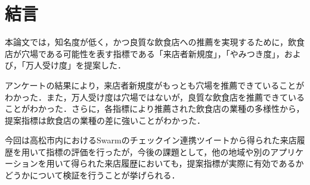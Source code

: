 \chapter{結言}
\label{chap:conclusion}

 本論文では，知名度が低く，かつ良質な飲食店への推薦を実現するために，飲食店が穴場である可能性を表す指標である「来店者新規度」，「やみつき度」，および，「万人受け度」を提案した．\par
アンケートの結果により，来店者新規度がもっとも穴場を推薦できていることがわかった．また，万人受け度は穴場ではないが，良質な飲食店を推薦できていることがわかった．さらに，各指標により推薦された飲食店の業種の多様性から，提案指標は飲食店の業種の差に強いことがわかった．\par
今回は高松市内におけるSwarmのチェックイン連携ツイートから得られた来店履歴を用いて指標の評価を行ったが，今後の課題として，他の地域や別のアプリケーションを用いて得られた来店履歴においても，提案指標が実際に有効であるかどうかについて検証を行うことが挙げられる．\par
